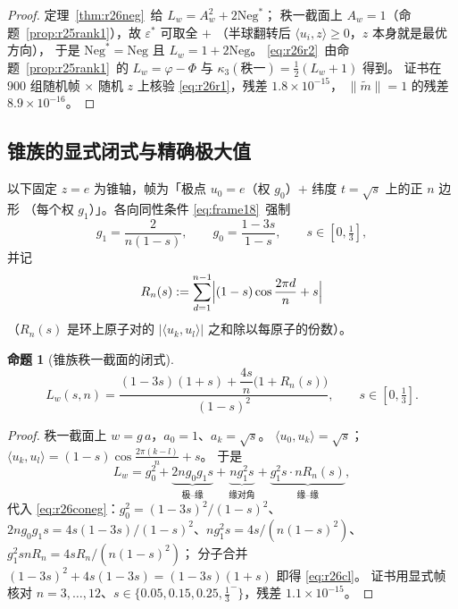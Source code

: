 \documentclass[UTF8,11pt]{ctexart}
\newtheorem{proposition}[theorem]{命题}
\theoremstyle{definition}
\begin{document}
\begin{proof}
定理~\ref{thm:r26neg}~给 $L_w=A_w^2+2\mathrm{Neg}^*$；
秩一截面上 $A_w=1$（命题~\ref{prop:r25rank1}），故 $\varepsilon^*$ 可取全 $+$
（半球翻转后 $\langle u_i,z\rangle\ge0$，$z$ 本身就是最优方向），
于是 $\mathrm{Neg}^*=\mathrm{Neg}$ 且 $L_w=1+2\mathrm{Neg}$。
\eqref{eq:r26r2}~由命题~\ref{prop:r25rank1}~的 $L_w=\varphi-\Phi$ 与
$\kappa_3(\text{秩一})=\frac12(L_w+1)$ 得到。
证书在 $900$ 组随机帧 $\times$ 随机 $z$ 上核验 \eqref{eq:r26r1}，残差 $1.8\times10^{-15}$，
$\|\widetilde m\|=1$ 的残差 $8.9\times10^{-16}$。
\end{proof}

\subsection{锥族的显式闭式与精确极大值}\label{sec:r26:cone}

以下固定 $z=e$ 为锥轴，帧为「极点 $u_0=e$（权 $g_0$）$+$ 纬度 $t=\sqrt s$ 上的正 $n$ 边形
（每个权 $g_1$）」。各向同性条件 \eqref{eq:frame18}~强制
\begin{equation}\label{eq:r26coneg}
g_1=\frac{2}{n(1-s)},\qquad g_0=\frac{1-3s}{1-s},\qquad s\in[0,\tfrac13],
\end{equation}
并记
\begin{equation}\label{eq:r26Rn}
R_n(s):=\sum_{d=1}^{n-1}\Bigl|(1-s)\cos\frac{2\pi d}n+s\Bigr|
\end{equation}
（$R_n(s)$ 是环上原子对的 $|\langle u_k,u_l\rangle|$ 之和除以每原子的份数）。

\begin{proposition}[锥族秩一截面的闭式]\label{prop:r26conecl}
\begin{equation}\label{eq:r26cl}
L_w(s,n)=\frac{(1-3s)(1+s)+\dfrac{4s}{n}\bigl(1+R_n(s)\bigr)}{(1-s)^2},
\qquad s\in[0,\tfrac13].
\end{equation}
\end{proposition}

\begin{proof}
秩一截面上 $w=g\,a$，$a_0=1$、$a_k=\sqrt s$。
$\langle u_0,u_k\rangle=\sqrt s$；$\langle u_k,u_l\rangle=(1-s)\cos\frac{2\pi(k-l)}n+s$。
于是
\[
L_w=g_0^2+\underbrace{2ng_0g_1s}_{\text{极--缘}}
+\underbrace{ng_1^2s}_{\text{缘对角}}+\underbrace{g_1^2s\cdot nR_n(s)}_{\text{缘--缘}},
\]
代入 \eqref{eq:r26coneg}：$g_0^2=(1-3s)^2/(1-s)^2$、
$2ng_0g_1s=4s(1-3s)/(1-s)^2$、$ng_1^2s=4s/(n(1-s)^2)$、
$g_1^2snR_n=4sR_n/(n(1-s)^2)$；
分子合并 $(1-3s)^2+4s(1-3s)=(1-3s)(1+s)$ 即得 \eqref{eq:r26cl}。
证书用显式帧核对 $n=3,\dots,12$、$s\in\{0.05,0.15,0.25,\frac13^-\}$，残差 $1.1\times10^{-15}$。
\end{proof}
\end{document}

